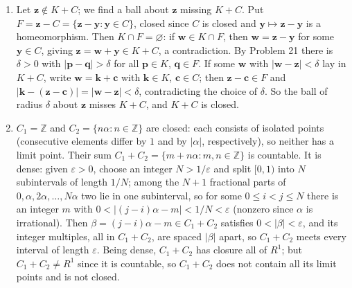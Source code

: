 \documentclass[main.tex]{subfiles}
\begin{document}
\begin{SolutionBlue}
\begin{enumerate}
\item Let $\mathbf{z} \notin K + C$; we find a ball about $\mathbf{z}$ missing $K + C$. Put $F = \mathbf{z} - C = \{\mathbf{z} - \mathbf{y} : \mathbf{y} \in C\}$, closed since $C$ is closed and $\mathbf{y} \mapsto \mathbf{z} - \mathbf{y}$ is a homeomorphism. Then $K \cap F = \varnothing$: if $\mathbf{w} \in K \cap F$, then $\mathbf{w} = \mathbf{z} - \mathbf{y}$ for some $\mathbf{y} \in C$, giving $\mathbf{z} = \mathbf{w} + \mathbf{y} \in K + C$, a contradiction. By Problem 21 there is $\delta > 0$ with $|\mathbf{p} - \mathbf{q}| > \delta$ for all $\mathbf{p} \in K$, $\mathbf{q} \in F$. If some $\mathbf{w}$ with $|\mathbf{w} - \mathbf{z}| < \delta$ lay in $K + C$, write $\mathbf{w} = \mathbf{k} + \mathbf{c}$ with $\mathbf{k} \in K$, $\mathbf{c} \in C$; then $\mathbf{z} - \mathbf{c} \in F$ and $|\mathbf{k} - (\mathbf{z} - \mathbf{c})| = |\mathbf{w} - \mathbf{z}| < \delta$, contradicting the choice of $\delta$. So the ball of radius $\delta$ about $\mathbf{z}$ misses $K + C$, and $K + C$ is closed.

\item $C_{1} = \mathbb{Z}$ and $C_{2} = \{n\alpha : n \in \mathbb{Z}\}$ are closed: each consists of isolated points (consecutive elements differ by $1$ and by $|\alpha|$, respectively), so neither has a limit point. Their sum $C_{1} + C_{2} = \{m + n\alpha : m, n \in \mathbb{Z}\}$ is countable. It is dense: given $\varepsilon > 0$, choose an integer $N > 1/\varepsilon$ and split $[0, 1)$ into $N$ subintervals of length $1/N$; among the $N + 1$ fractional parts of $0, \alpha, 2\alpha, \dots, N\alpha$ two lie in one subinterval, so for some $0 \le i < j \le N$ there is an integer $m$ with $0 < |(j - i)\alpha - m| < 1/N < \varepsilon$ (nonzero since $\alpha$ is irrational). Then $\beta = (j - i)\alpha - m \in C_{1} + C_{2}$ satisfies $0 < |\beta| < \varepsilon$, and its integer multiples, all in $C_{1} + C_{2}$, are spaced $|\beta|$ apart, so $C_{1} + C_{2}$ meets every interval of length $\varepsilon$. Being dense, $C_{1} + C_{2}$ has closure all of $R^{1}$; but $C_{1} + C_{2} \ne R^{1}$ since it is countable, so $C_{1} + C_{2}$ does not contain all its limit points and is not closed.
\end{enumerate}
\end{SolutionBlue}
\end{document}
